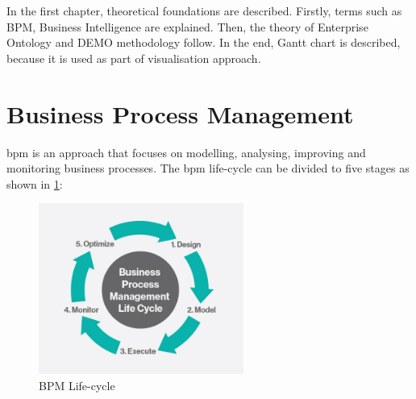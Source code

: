 In the first chapter, theoretical foundations are described. Firstly, terms such as BPM, Business Intelligence are explained. Then, the theory of Enterprise Ontology and DEMO methodology follow. In the end, Gantt chart is described, because it is used as part of visualisation approach. 
\section{Business Process Management}
\gls{bpm} is an approach that focuses on modelling, analysing, improving and monitoring business processes. 
The \gls{bpm} life-cycle can be divided to five stages as shown in \cref{fig:bpm-lifecycle}:

\begin{figure}[ht!]
	\centering
    \includegraphics[width=0.6\textwidth, keepaspectratio]{img/bpm-lifecycle.jpg}
    \caption{BPM Life-cycle\cite{harvey-koeppel-bpm-lifecycle-2015}}
    \label{fig:bpm-lifecycle}
\end{figure}

